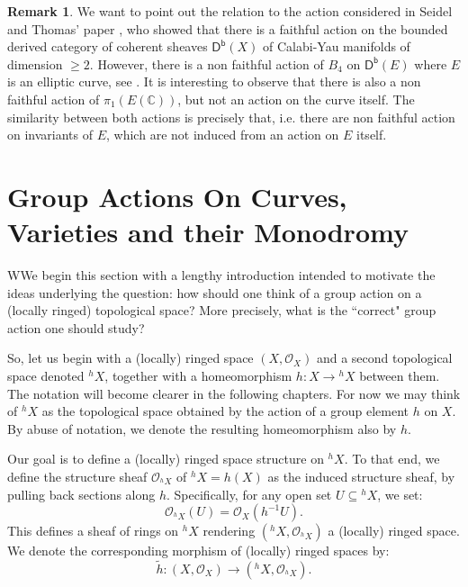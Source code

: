 \documentclass[10pt]{amsart}
\theoremstyle{definition}
\newtheorem{remark}[theorem]{Remark}
\renewcommand{\O}{{\mathcal{O}}}
\begin{document}
\begin{remark}\label{rem:action on elliptic curves}
We want to point out the relation to the action considered in Seidel and Thomas' paper \cite{MR1831820}, who showed that there is a faithful action on the bounded derived category of coherent sheaves $\mathsf{D^b}(X)$ of Calabi-Yau manifolds of dimension $\geq 2$. However, there is a non faithful action of $B_4$ on $\mathsf{D^b}(E)$ where $E$ is an elliptic curve, see \cite[Section 3d]{MR1831820}. It is interesting to observe that there is also a non faithful action of $\pi_1(E(\mathbb{C}))$, but not an action on the curve itself. The similarity between both actions is precisely that, i.e. there are non faithful action on invariants of $E$, which are not induced from an action on $E$ itself.
\end{remark}


\section{Group Actions On Curves, Varieties and their Monodromy}\label{ch:groupactions}

WWe begin this section with a lengthy introduction intended to motivate the ideas underlying the question: how should one think of a group action on a (locally ringed) topological space? More precisely, what is the “correct" group action one should study?


So, let us begin with a (locally) ringed space $(X, \mathcal{O}_X)$ and a second topological space denoted $^h\!X$, together with a homeomorphism $h \colon X \rightarrow {^h \! X}$ between them. The notation will become clearer in the following chapters. For now we may think of $^h\!X$ as the topological space obtained by the action of a group element $h$ on $X$. By abuse of notation, we denote the resulting homeomorphism also by $h$.

Our goal is to define a (locally) ringed space structure on $^h \! X$.
To that end, we define the structure sheaf $\mathcal{O}_{^h \! X}$ of ${^h\!X}=h(X)$ as the induced structure sheaf, by pulling back sections along $h$. Specifically, for any open set $U \subseteq {^h\!X}$, we set: 
\[
  \O_{{^h \! X}} (U) = \O_X (h^{-1}U).  
\]
This defines a sheaf of rings on ${^h \! X}$ rendering $(^h \! X, \O_{^h \! X})$ a (locally) ringed space. We denote the corresponding morphism of (locally) ringed spaces by:
\[
\tilde{h} \colon (X, \O_X) 
\to (^h \! X, \O_{^h \! X}).  
\]
\end{document}
